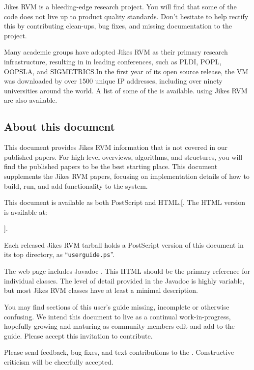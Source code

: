 Jikes RVM is a bleeding-edge research project.  You will find that
some of the code does not live up to product quality standards.  Don't
hesitate to help rectify this by contributing clean-ups, bug fixes,
and missing documentation to the project.

Many academic groups have adopted Jikes RVM as their primary research
infrastructure, resulting in
in leading
conferences, such as PLDI, POPL, OOPSLA, and SIGMETRICS.\@  In the first year
of its open source release, the VM was downloaded by over
1500 unique IP addresses, including over ninety
universities around the world. A list
of some of the  is available.
 using
Jikes RVM are also available.

\subsection{About this document}

This document provides Jikes\TMweb{} RVM information that is not
covered in our published papers.  For high-level overviews,
algorithms, and structures, you will find the published papers to be
the best starting place. This document supplements the Jikes RVM
papers, focusing on implementation details of how to build, run,
and add functionality to the system.

This document is available as both PostScript\Rboth{} and HTML.\@  {}[.  The HTML version is
available at:
\begin{example}
\RVMUserGuideURL
\end{example}
].

Each released Jikes RVM tarball holds a PostScript version of this
document in its top directory, as ``{\tt userguide.ps}''.


The \jrvm{} web page includes Javadoc\TMboth{}
. 
This HTML should be the primary reference for individual classes. The
level of detail provided in the Javadoc is highly variable, but most
Jikes RVM classes have at least a minimal description.

You may find sections of this user's guide missing, incomplete or
otherwise confusing. We intend this document to live as a continual
work-in-progress, hopefully growing and maturing as community members
edit and add to the guide.  Please accept this invitation to
contribute.

Please send feedback, bug fixes, and text contributions to the 
.  
Constructive criticism will be cheerfully accepted. 

